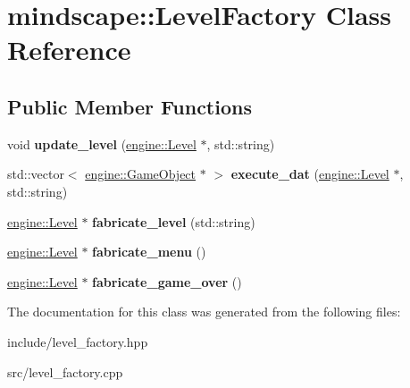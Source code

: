 \hypertarget{classmindscape_1_1_level_factory}{}\section{mindscape\+:\+:Level\+Factory Class Reference}
\label{classmindscape_1_1_level_factory}
\subsection*{Public Member Functions}
\begin{DoxyCompactItemize}
\item 
void {\bfseries update\+\_\+level} (\hyperlink{classengine_1_1_level}{engine\+::\+Level} $\ast$, std\+::string)\hypertarget{classmindscape_1_1_level_factory_a3efd3986dfa9743e991136c2fd0fdfa7}{}\label{classmindscape_1_1_level_factory_a3efd3986dfa9743e991136c2fd0fdfa7}

\item 
std\+::vector$<$ \hyperlink{classengine_1_1_game_object}{engine\+::\+Game\+Object} $\ast$ $>$ {\bfseries execute\+\_\+dat} (\hyperlink{classengine_1_1_level}{engine\+::\+Level} $\ast$, std\+::string)\hypertarget{classmindscape_1_1_level_factory_a7cbf020dcecda609facd675301f6500b}{}\label{classmindscape_1_1_level_factory_a7cbf020dcecda609facd675301f6500b}

\item 
\hyperlink{classengine_1_1_level}{engine\+::\+Level} $\ast$ {\bfseries fabricate\+\_\+level} (std\+::string)\hypertarget{classmindscape_1_1_level_factory_a67ad7ffcf945347c5ad92e978981a7fc}{}\label{classmindscape_1_1_level_factory_a67ad7ffcf945347c5ad92e978981a7fc}

\item 
\hyperlink{classengine_1_1_level}{engine\+::\+Level} $\ast$ {\bfseries fabricate\+\_\+menu} ()\hypertarget{classmindscape_1_1_level_factory_a034add473a2869c13784de4f321cd279}{}\label{classmindscape_1_1_level_factory_a034add473a2869c13784de4f321cd279}

\item 
\hyperlink{classengine_1_1_level}{engine\+::\+Level} $\ast$ {\bfseries fabricate\+\_\+game\+\_\+over} ()\hypertarget{classmindscape_1_1_level_factory_ab1db9f9c0e7a7ce23c46580750a3e222}{}\label{classmindscape_1_1_level_factory_ab1db9f9c0e7a7ce23c46580750a3e222}

\end{DoxyCompactItemize}


The documentation for this class was generated from the following files\+:\begin{DoxyCompactItemize}
\item 
include/level\+\_\+factory.\+hpp\item 
src/level\+\_\+factory.\+cpp\end{DoxyCompactItemize}
